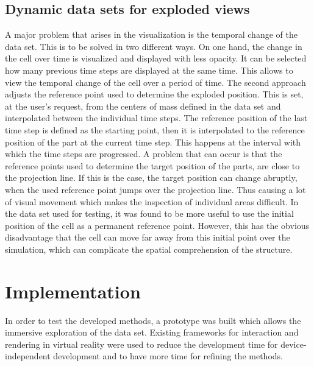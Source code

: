 \subsection{Dynamic data sets for exploded views}

A major problem that arises in the visualization is the temporal change of the data set. This is to be solved in two different ways.
On one hand, the change in the cell over time is visualized and displayed with less opacity.
It can be selected how many previous time steps are displayed at the same time.
This allows to view the temporal change of the cell over a period of time.
The second approach adjusts the reference point used to determine the exploded position. 
This is set, at the user's request, from the centers of mass defined in the data set and interpolated between the individual time steps.
The reference position of the last time step is defined as the starting point, then it is interpolated to the reference position of the part at the current time step. This happens at the interval with which the time steps are progressed. 
A problem that can occur is that the reference points used to determine the target position of the parts, are close to the projection line. 
If this is the case, the target position can change abruptly, when the used reference point jumps over the projection line. Thus causing a lot of visual movement which makes the inspection of individual areas difficult.  
In the data set used for testing, it was found to be more useful to use the initial position of the cell as a permanent reference point. 
However, this has the obvious disadvantage that the cell can move far away from this initial point over the simulation, which can complicate the spatial comprehension of the structure. 


\section{Implementation}

In order to test the developed methods, a prototype was built which allows the immersive exploration of the data set. Existing frameworks for interaction and rendering in virtual reality were used to reduce the development time for device-independent development and to have more time for refining the methods.

